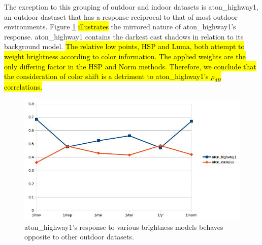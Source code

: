 \documentclass[12pt]{report}
\begin{document}
The exception to this grouping of outdoor and indoor datasets is aton\_highway1, an outdoor dastaset that has a response reciprocal to that of most outdoor environments. Figure \ref{fig:highway1_reciprocal} \hl{illustrates} the mirrored nature of aton\_highway1's response. 
aton\_highway1 contains the darkest cast shadows in relation to its background model. \hl{The relative low points, HSP and Luma, both attempt to weight brightness according to color information. The applied weights are the only differing factor in the HSP and Norm methods. Therefore, we conclude that the consideration of color shift is a detriment to aton\_highway1's $\rho_{dB}$ correlations.}

\begin{figure}
\centering
  \includegraphics[width=1\linewidth]{figures/brightness/db/highway1_reciprocal.jpg}
\caption{aton\_highway1's response to various brightness models behaves opposite to other outdoor datasets.}
\label{fig:highway1_reciprocal}
\end{figure}

\end{document}
